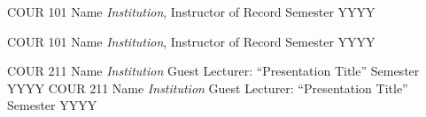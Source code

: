 


\begin{cvhonors}

  \cvhonor
    {COUR 101 Name} %
    {\textit{Institution}, Instructor of Record} %
    {} %
    {Semester YYYY} %

  \cvhonor
    {COUR 101 Name} %
    {\textit{Institution}, Instructor of Record} %
    {} %
    {Semester YYYY} %

\end{cvhonors} 

\begin{cvhonors}

  \cvhonor
    {COUR 211 Name} %
    {\textit{Institution} Guest Lecturer: “Presentation Title” } %
    {} %
    {Semester YYYY} %
  \cvhonor
    {COUR 211 Name} %
    {\textit{Institution} Guest Lecturer: “Presentation Title” } %
    {} %
    {Semester YYYY} %

\end{cvhonors}
